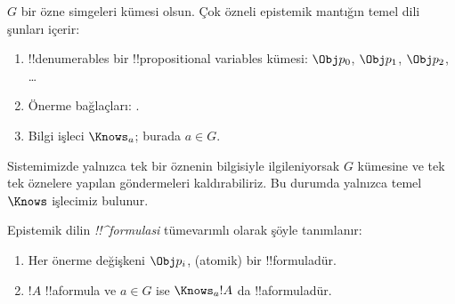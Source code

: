 



\begin{defn}
$G$ bir özne simgeleri kümesi olsun. Çok özneli epistemik mantığın temel dili
şunları içerir:
\begin{enumerate}
  \item !!{denumerable}s bir !!{propositional variable}s kümesi: $\Obj
    p_0$, $\Obj p_1$, $\Obj p_2$, \dots
  \item Önerme bağlaçları: \startycommalist
  .
  \item Bilgi işleci $\Knows_a$; burada $a \in G$.
\end{enumerate}
\end{defn}

Sistemimizde yalnızca tek bir öznenin bilgisiyle ilgileniyorsak $G$ kümesine
ve tek tek öznelere yapılan göndermeleri kaldırabiliriz. Bu durumda yalnızca
temel $\Knows$ işlecimiz bulunur.

\begin{defn}
Epistemik dilin \emph{!!^{formula}s{}i} tümevarımlı olarak şöyle tanımlanır:
\begin{enumerate}


\item Her önerme değişkeni $\Obj p_i$, (atomik) bir !!{formula}{}dür.






\item $!A$ !!a{formula} ve $a \in G$ ise $\Knows_a !A$ da
  !!a{formula}{}dür.

\end{enumerate}
\end{defn}

